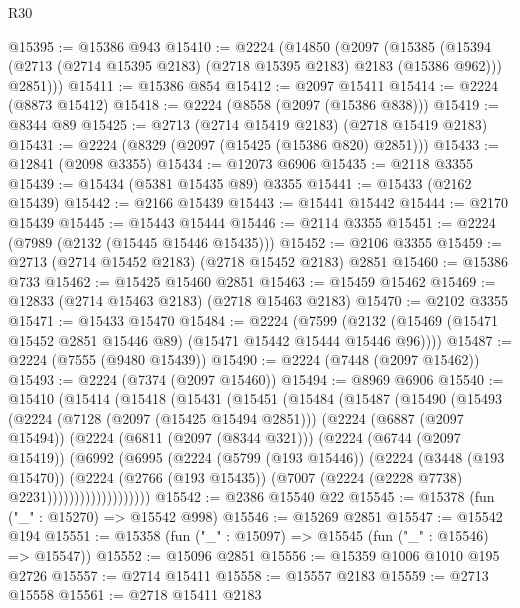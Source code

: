 \begin{lexlean}{R30}
\begin{coremodule}
@15395 := @15386 @943
@15410 := @2224
    (@14850
      (@2097
        (@15385
          (@15394 (@2713 (@2714 @15395 @2183) (@2718 @15395 @2183) @2183 (@15386 @962)))
          @2851)))
@15411 := @15386 @854
@15412 := @2097 @15411
@15414 := @2224 (@8873 @15412)
@15418 := @2224 (@8558 (@2097 (@15386 @838)))
@15419 := @8344 @89
@15425 := @2713 (@2714 @15419 @2183) (@2718 @15419 @2183)
@15431 := @2224 (@8329 (@2097 (@15425 (@15386 @820) @2851)))
@15433 := @12841 (@2098 @3355)
@15434 := @12073 @6906
@15435 := @2118 @3355
@15439 := @15434 (@5381 @15435 @89) @3355
@15441 := @15433 (@2162 @15439)
@15442 := @2166 @15439
@15443 := @15441 @15442
@15444 := @2170 @15439
@15445 := @15443 @15444
@15446 := @2114 @3355
@15451 := @2224 (@7989 (@2132 (@15445 @15446 @15435)))
@15452 := @2106 @3355
@15459 := @2713 (@2714 @15452 @2183) (@2718 @15452 @2183) @2851
@15460 := @15386 @733
@15462 := @15425 @15460 @2851
@15463 := @15459 @15462
@15469 := @12833 (@2714 @15463 @2183) (@2718 @15463 @2183)
@15470 := @2102 @3355
@15471 := @15433 @15470
@15484 := @2224
    (@7599 (@2132 (@15469 (@15471 @15452 @2851 @15446 @89) (@15471 @15442 @15444 @15446 @96))))
@15487 := @2224 (@7555 (@9480 @15439))
@15490 := @2224 (@7448 (@2097 @15462))
@15493 := @2224 (@7374 (@2097 @15460))
@15494 := @8969 @6906
@15540 := @15410
    (@15414
      (@15418
        (@15431
          (@15451
            (@15484
              (@15487
                (@15490
                  (@15493
                    (@2224
                      (@7128 (@2097 (@15425 @15494 @2851)))
                      (@2224
                        (@6887 (@2097 @15494))
                        (@2224
                          (@6811 (@2097 (@8344 @321)))
                          (@2224
                            (@6744 (@2097 @15419))
                            (@6992
                              (@6995
                                (@2224
                                  (@5799 (@193 @15446))
                                  (@2224
                                    (@3448 (@193 @15470))
                                    (@2224
                                      (@2766 (@193 @15435))
                                      (@7007 (@2224 (@2228 @7738) @2231)))))))))))))))))))
@15542 := @2386 @15540 @22
@15545 := @15378 (fun ("_" : @15270) => @15542 @998)
@15546 := @15269 @2851
@15547 := @15542 @194
@15551 := @15358 (fun ("_" : @15097) => @15545 (fun ("_" : @15546) => @15547))
@15552 := @15096 @2851
@15556 := @15359 @1006 @1010 @195 @2726
@15557 := @2714 @15411
@15558 := @15557 @2183
@15559 := @2713 @15558
@15561 := @2718 @15411 @2183

\end{coremodule}
\end{lexlean}
